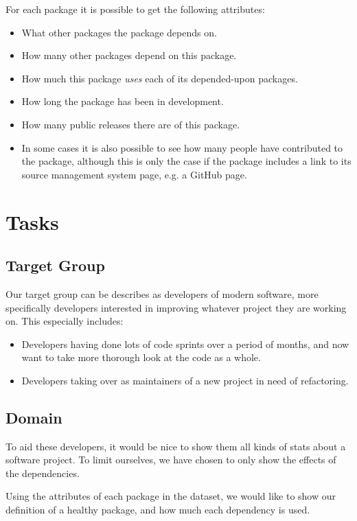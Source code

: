 \documentclass[a4paper,12pt]{article}
\begin{document}
For each package it is possible to get the following attributes:

\begin{itemize}
\item What other packages the package depends on.
\item How many other packages depend on this package.
\item How much this package \emph{uses} each of its depended-upon
packages.
\item How long the package has been in development.
\item How many public releases there are of this package.
\item In some cases it is also possible to see how many people have contributed
to the package, although this is only the case if the package includes a link to
its source management system page, e.g. a GitHub page.
\end{itemize}


\section{Tasks}

\subsection{Target Group}

Our target group can be describes as developers of modern software, more
specifically developers interested in improving whatever project they are
working on.  This especially includes:

\begin{itemize}
\item Developers having done lots of code sprints over a period of months, and
now want to take more thorough look at the code as a whole.
\item Developers taking over as maintainers of a new project in need of
refactoring.
\end{itemize}


\subsection{Domain}

To aid these developers, it would be nice to show them all kinds of stats about
a software project.  To limit ourselves, we have chosen to only show the effects
of the dependencies.

Using the attributes of each package in the dataset, we would like to show our
definition of a healthy package, and how much each dependency is used.
\end{document}
